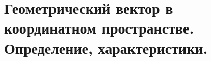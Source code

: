 \section{Геометрический вектор в координатном пространстве. Определение, характеристики.}

\pagebreak